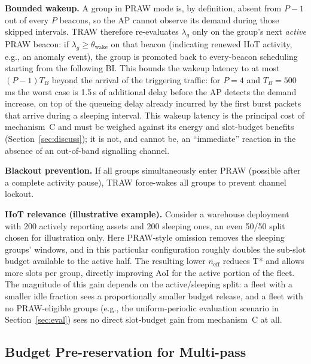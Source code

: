 \documentclass[journal]{IEEEtran}
\begin{document}
\textbf{Bounded wakeup.}
A group in PRAW mode is, by definition, absent from $P-1$ out of every
$P$ beacons, so the AP cannot observe its demand during those skipped
intervals.
TRAW therefore re-evaluates $\lambda_g$ only on the group's next
\emph{active} PRAW beacon: if $\lambda_g\!\geq\!\theta_\mathrm{wake}$
on that beacon (indicating renewed IIoT activity, e.g., an anomaly
event), the group is promoted back to every-beacon scheduling starting
from the following BI.
This bounds the wakeup latency to at most $(P-1)T_B$ beyond the
arrival of the triggering traffic: for $P\!=\!4$ and $T_B\!=\!500$\,ms
the worst case is 1.5\,s of additional delay before the AP detects the
demand increase, on top of the queueing delay already incurred by the
first burst packets that arrive during a sleeping interval.
This wakeup latency is the principal cost of mechanism~C and must be
weighed against its energy and slot-budget benefits
(Section~\ref{sec:discuss}); it is not, and cannot be, an
``immediate'' reaction in the absence of an out-of-band signalling
channel.

\textbf{Blackout prevention.}
If all groups simultaneously enter PRAW (possible after a complete
activity pause), TRAW force-wakes all groups to prevent channel lockout.

\textbf{IIoT relevance (illustrative example).}
Consider a warehouse deployment with 200 actively reporting assets and
200 sleeping ones, an even 50/50 split chosen for illustration only.
Here PRAW-style omission removes the sleeping groups' windows, and in this
particular configuration roughly doubles the sub-slot budget available
to the active half.
The resulting lower $n_\mathrm{eff}$ reduces T* and allows more slots
per group, directly improving AoI for the active portion of the fleet.
The magnitude of this gain depends on the active/sleeping split: a
fleet with a smaller idle fraction sees a proportionally smaller
budget release, and a fleet with no PRAW-eligible groups (e.g., the
uniform-periodic evaluation scenario in
Section~\ref{sec:eval}) sees no direct slot-budget gain from mechanism~C at
all.

\subsection{Budget Pre-reservation for Multi-pass}
\label{sec:prereserve}
\end{document}
